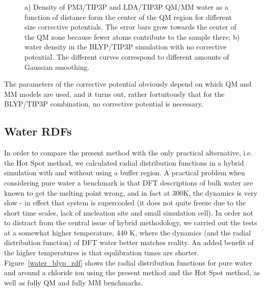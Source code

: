\documentclass[11pt]{revtex4}
\begin{document}
\begin{figure}
\caption{a) Density of PM3/TIP3P and LDA/TIP3P QM/MM water as a function of distance form the center of the QM region for different size corrective potentials. The error bars grow towards the center of the QM zone because fewer atoms contribute to the sample there; b) water density in the BLYP/TIP3P simulation with no corrective potential. The different curves correspond to different amounts of Gaussian smoothing.}
\label{density}
\end{figure}

The parameters of the corrective potential obviously depend on which QM and MM models are used, and it turns out, rather fortuitously that for the BLYP/TIP3P combination, no corrective potential is necessary. 

\subsection{Water RDFs}
In order to compare the present method with the only practical alternative, i.e. the Hot Spot method, we calculated radial distribution functions in a hybrid simulation with and without using a buffer region.  A practical problem when considering pure water a benchmark is that DFT descriptions of bulk water are known to get the melting point wrong, and in fact at 300K, the dynamics is very slow - in effect that system is supercooled (it does not quite freeze due to the short time scales, lack of nucleation site and small simulation cell). In order not to distract from the central issue of hybrid methodology, we carried out the tests at a somewhat higher temperature, 440 K, where the dynamics (and the radial distribution function) of DFT water better matches reality. An added benefit of the higher temperatures is that equlibration times are shorter. Figure~\ref{water_blyp_rdf} shows the radial distribution functions for pure water and around a chloride ion using the present method and the Hot Spot method, as well as fully QM and fully MM benchmarks.
\end{document}
